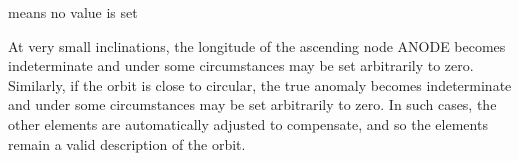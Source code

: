 \documentclass[twoside,11pt,nolof]{starlink}
\begin{document}
{{{         \sstitem
              means no value is set

         \sstitem
          At very small inclinations, the longitude of the ascending node
           ANODE becomes indeterminate and under some circumstances may be
           set arbitrarily to zero.  Similarly, if the orbit is close to
           circular, the true anomaly becomes indeterminate and under some
           circumstances may be set arbitrarily to zero.  In such cases,
           the other elements are automatically adjusted to compensate,
           and so the elements remain a valid description of the orbit.
      }
   }
}
\end{document}
